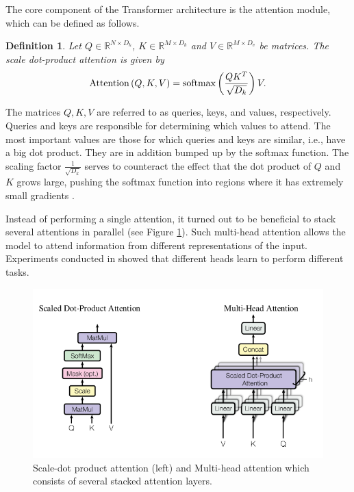 \documentclass[magisterska,en]{pracamgr}
\newtheorem{defi}{Definition}[section]
\begin{document}
The core component of the Transformer architecture is the attention module, which can be defined as follows.

\begin{defi}\label{attention_def}
    Let $Q \in \mathbb{R}^{N\times D_k}$, $K \in \mathbb{R}^{M\times D_k}$ and $V \in \mathbb{R}^{M\times D_v}$ be matrices. The scale dot-product attention is given by
        \begin{equation*}
        \normalfont
        \textrm{Attention} \left( Q, K, V \right) = \textrm{softmax}\left(\frac{QK^T}{\sqrt{D_k}} \right) V.  
    \end{equation*}

\end{defi}

The matrices $Q, K, V$ are referred to as queries, keys, and values, respectively. Queries and keys are responsible for determining which values to attend. The most important values are those for which queries and keys are similar, i.e., have a big dot product. They are in addition bumped up by the softmax function. The scaling factor $\frac{1}{\sqrt{D_k}}$ serves to counteract the effect that the dot product of $Q$ and $K$ grows large, pushing the softmax function into regions where it has extremely small gradients \cite{DBLP:conf/nips/VaswaniSPUJGKP17}.

Instead of performing a single attention, it turned out to be beneficial to stack several attentions in parallel (see Figure \ref{multi-head}). Such multi-head attention allows the model to attend information from different representations of the input. Experiments conducted in \cite{DBLP:conf/nips/VaswaniSPUJGKP17} showed that different heads learn to perform different tasks.

\begin{figure}[H]
\centering
\includegraphics[scale=0.7]{images/attention_module.png}
\caption{Scale-dot product attention (left) and Multi-head attention which consists of several stacked attention layers.}
\label{multi-head}
\end{figure}
\end{document}
